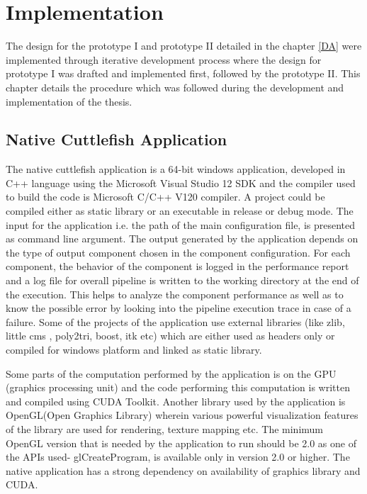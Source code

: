 \chapter{Implementation}

The design for the prototype I and prototype II detailed in the chapter \ref{DA} were implemented through iterative development process where the design for prototype I was drafted and implemented first, followed by the prototype II. This chapter details the procedure which was followed during the development and implementation of the thesis.  

\section{Native Cuttlefish Application} 
The native cuttlefish application is a 64-bit windows application, developed in C++ language using the Microsoft Visual Studio 12 SDK and the compiler used to build the code is Microsoft C/C++ V120 compiler. A project could be compiled either as static library or an executable in release or debug mode. The input for the application i.e. the path of the main configuration file, is presented as command line argument. The output generated by the application depends on the type of output component chosen in the component configuration. For each component, the behavior of the component is logged in the performance report and a log file for overall pipeline is written to the working directory at the end of the execution. This helps to analyze the component performance as well as to know the possible error by looking into the pipeline execution trace in case of a failure. Some of the projects of the application use external libraries (like zlib, little cms , poly2tri, boost, itk etc) which are either used as headers only or compiled for windows platform and linked as static library. 

Some parts of the computation performed by the application is on the GPU (graphics processing unit) and the code performing this computation is written and compiled using CUDA Toolkit. Another library used by the application is OpenGL(Open Graphics Library) wherein various powerful visualization features of the library are used for rendering, texture mapping etc. The minimum OpenGL version that is needed by the application to run should be 2.0 as one of the APIs used- glCreateProgram, is available only in version 2.0 or higher. The native application has a strong dependency on availability of graphics library and CUDA.     

